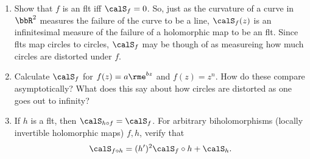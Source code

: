 \begin{xca}
    \begin{enumerate}
        \item Show that $f$ is an \gls{flt} iff $\calS_f=0$. So, just as the curvature of a curve in $\bbR^2$ measures the failure of the curve to be a line, $\calS_f(z)$ is an infinitesimal measure of the failure of a holomorphic map to be an \gls{flt}. Since \glspl{flt} map circles to circles, $\calS_f$ may be though of as measureing how much circles are distorted under $f$.
        \item Calculate $\calS_f$ for $f(z)=a\rme^{bz}$ and $f(z)=z^n$. How do these compare asymptotically? What does this say about how circles are distorted as one goes out to infinity?
        \item If $h$ is a \gls{flt}, then $\calS_{h\circ f}=\calS_f$. For arbitrary biholomorphisms (locally invertible holomorphic maps) $f,h$, verify that 
        \[\calS_{f\circ h}=(h')^2 \calS_f\circ h+\calS_h.\label{schwarzian composition}\]
    \end{enumerate}
\end{xca}


